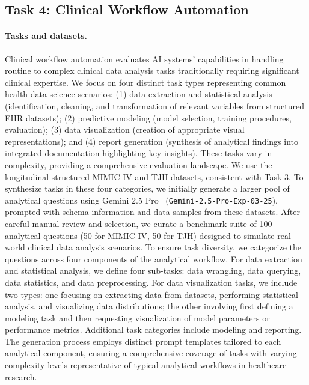 \documentclass{article}
\begin{document}
\subsection{Task 4: Clinical Workflow Automation}
\label{subsec:task_clinical_workflow_automation}

\paragraph{Tasks and datasets.} Clinical workflow automation evaluates AI systems' capabilities in handling routine to complex clinical data analysis tasks traditionally requiring significant clinical expertise. We focus on four distinct task types representing common health data science scenarios: (1) data extraction and statistical analysis (identification, cleaning, and transformation of relevant variables from structured EHR datasets); (2) predictive modeling (model selection, training procedures, evaluation); (3) data visualization (creation of appropriate visual representations); and (4) report generation (synthesis of analytical findings into integrated documentation highlighting key insights). These tasks vary in complexity, providing a comprehensive evaluation landscape. We use the longitudinal structured MIMIC-IV and TJH datasets, consistent with Task 3. To synthesize tasks in these four categories, we initially generate a larger pool of analytical questions using Gemini 2.5 Pro~\cite{gemini} (\texttt{Gemini-2.5-Pro-Exp-03-25}), prompted with schema information and data samples from these datasets. After careful manual review and selection, we curate a benchmark suite of 100 analytical questions (50 for MIMIC-IV, 50 for TJH) designed to simulate real-world clinical data analysis scenarios. To ensure task diversity, we categorize the questions across four components of the analytical workflow. For data extraction and statistical analysis, we define four sub-tasks: data wrangling, data querying, data statistics, and data preprocessing. For data visualization tasks, we include two types: one focusing on extracting data from datasets, performing statistical analysis, and visualizing data distributions; the other involving first defining a modeling task and then requesting visualization of model parameters or performance metrics. Additional task categories include modeling and reporting. The generation process employs distinct prompt templates tailored to each analytical component, ensuring a comprehensive coverage of tasks with varying complexity levels representative of typical analytical workflows in healthcare research.
\end{document}
